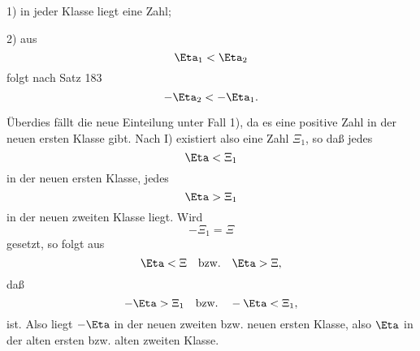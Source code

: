1) in jeder Klasse liegt eine Zahl;

2) aus
$$\Eta_1 < \Eta_2$$
folgt nach Satz 183
$$-\Eta_2 < -\Eta_1.$$

\"Uberdies f\"allt die neue Einteilung unter Fall 1), da es eine
positive Zahl in der neuen ersten Klasse gibt.  Nach I) existiert
also eine Zahl $\Xi_1$, so da{\ss} jedes
$$\Eta < \Xi_1$$
in der neuen ersten Klasse, jedes
$$\Eta > \Xi_1$$
in der neuen zweiten Klasse liegt.  Wird
$$-\Xi_1 = \Xi$$
gesetzt, so folgt aus
$$\Eta < \Xi \quad\hbox{\rm bzw.}\quad \Eta > \Xi,$$
da{\ss}
$$-\Eta > \Xi_1 \quad\hbox{\rm bzw.}\quad -\Eta < \Xi_1,$$
ist. Also liegt $-\Eta$ in der neuen zweiten bzw. neuen ersten Klasse,
also $\Eta$ in der alten ersten bzw. alten zweiten Klasse.
\vfill\eject



